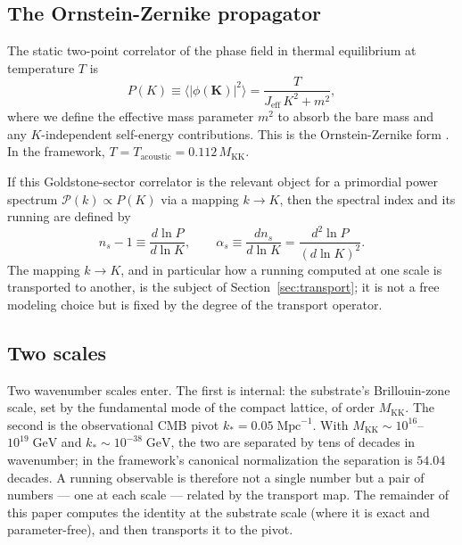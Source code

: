 \documentclass[12pt]{article}
\theoremstyle{definition}
\theoremstyle{remark}
\begin{document}
\subsection{The Ornstein-Zernike propagator}

The static two-point correlator of the phase field in thermal equilibrium at temperature $T$ is
\begin{equation}\label{eq:P-def}
  P(K) \equiv \langle |\phi(\mathbf{K})|^2 \rangle = \frac{T}{J_{\mathrm{eff}}\,K^2 + m^2},
\end{equation}
where we define the effective mass parameter $m^2$ to absorb the bare mass and any $K$-independent self-energy contributions. This is the Ornstein-Zernike form \citep{OrnsteinZernike1914}. In the framework, $T = T_{\mathrm{acoustic}} = 0.112\,M_{\mathrm{KK}}$.

If this Goldstone-sector correlator is the relevant object for a primordial power spectrum $\mathcal{P}(k) \propto P(K)$ via a mapping $k \to K$, then the spectral index and its running are defined by
\begin{equation}\label{eq:ns-def}
  n_s - 1 \equiv \frac{d\ln P}{d\ln K}, \qquad
  \alpha_s \equiv \frac{dn_s}{d\ln K} = \frac{d^2 \ln P}{(d\ln K)^2}.
\end{equation}
The mapping $k \to K$, and in particular how a running computed at one scale is transported to another, is the subject of Section~\ref{sec:transport}; it is not a free modeling choice but is fixed by the degree of the transport operator.

\subsection{Two scales}\label{sec:two-scales}

Two wavenumber scales enter. The first is internal: the substrate's Brillouin-zone scale, set by the fundamental mode of the compact lattice, of order $M_{\mathrm{KK}}$. The second is the observational CMB pivot $k_* = 0.05\;\mathrm{Mpc}^{-1}$. With $M_{\mathrm{KK}} \sim 10^{16}$--$10^{19}\;\mathrm{GeV}$ and $k_* \sim 10^{-38}\;\mathrm{GeV}$, the two are separated by tens of decades in wavenumber; in the framework's canonical normalization the separation is $54.04$ decades. A running observable is therefore not a single number but a pair of numbers --- one at each scale --- related by the transport map. The remainder of this paper computes the identity at the substrate scale (where it is exact and parameter-free), and then transports it to the pivot.
\end{document}

